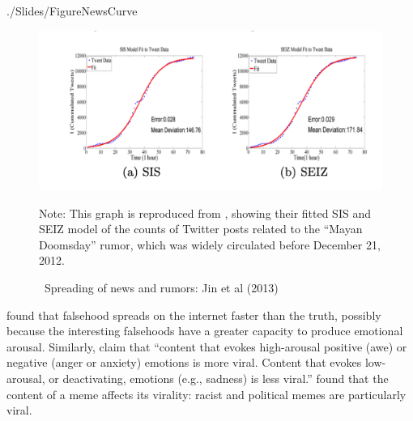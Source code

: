 \begin{verbatimwrite}{./Slides/FigureNewsCurve}
  \begin{figure}[!ht] \centering  %
    \caption{ ~Spreading of news and rumors: Jin et al (2013)}\nocite{jin2013epidemiological}
    \label{fig:news_curve}
    \centerline{\includegraphics[width=\textwidth]{./figures/Doomsday}}
    \begin{flushleft}{\footnotesize Note: This graph is reproduced from \cite{jin2013epidemiological}, showing their fitted SIS and SEIZ model of the counts of Twitter posts related to the ``Mayan Doomsday'' rumor, which was widely circulated before December 21, 2012.}
    \end{flushleft}
  \end{figure}
\end{verbatimwrite}%

\ifInBook{}{

}
 found that falsehood spreads on the internet faster than the truth, possibly because the interesting falsehoods have a greater capacity to produce emotional arousal.  Similarly,  claim that ``content that evokes high-arousal positive (awe) or negative (anger or anxiety) emotions is more viral. Content that evokes low-arousal, or deactivating, emotions (e.g., sadness) is less viral.''  found that the content of a meme affects its virality: racist and political memes are particularly viral.

